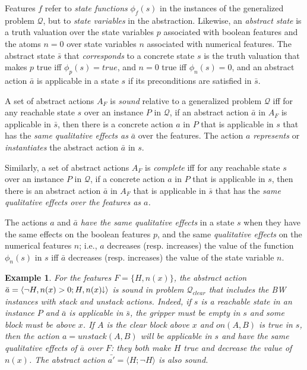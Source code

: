\documentclass[letterpaper]{article} %
\newcommand{\tup}[1]{\langle #1 \rangle}
\newtheorem{example}[definition]{Example}
\newcommand{\Q}{\mathcal{Q}}
\newcommand{\abst}[2]{\tup{#1;#2}}
\newcommand{\mminus}{\hspace{-.05em}\raisebox{.15ex}{\footnotesize$\downarrow$}}
\begin{document}
Features $f$ refer to \emph{state functions} $\phi_f(s)$  in the instances of the generalized problem $\Q$,
but to \emph{state variables} in the abstraction.  Likewise, an \emph{abstract state} is  a truth valuation over the
state variables  $p$ associated with boolean features and the atoms $n=0$ over  state variables  $n$ associated with numerical features.
The abstract state $\bar{s}$  that \emph{corresponds} to a concrete state $s$ is the truth valuation that makes
$p$ true iff $\phi_p(s)=true$, and $n=0$ true iff $\phi_n(s) = 0$, and an abstract action $\bar{a}$
is applicable in a state $s$ if its preconditions are satisfied in $\bar{s}$.

A set of abstract actions $A_F$ is \emph{sound}  relative to a generalized problem $\Q$ 
iff for any reachable state $s$ over an instance $P$ in $\Q$, if an abstract action $\bar{a}$ in $A_F$
is applicable in $\bar{s}$, then there is a concrete action $a$ in $P$ that is applicable in $s$
that has the \emph{same qualitative  effects as}  $\bar{a}$ over the features. The action $a$
\emph{represents} or \emph{instantiates}  the abstract action $\bar{a}$ in $s$. 

Similarly, a set of abstract actions $A_F$ is \emph{complete}
iff for any reachable state $s$ over an instance $P$ in $\Q$, if a concrete action $a$ in $P$
that is applicable in $s$, then there is an abstract action $\bar{a}$ in $A_F$
that is  applicable in $\bar{s}$ that has the \emph{same qualitative effects over the features as $a$.}


The actions $a$ and $\bar{a}$ \emph{have the same qualitative  effects} in a state $s$ 
when  they have the same   effects on the boolean features $p$,  and the same \emph{qualitative effects} on the numerical
features $n$; i.e., $a$ decreases (resp. increases) the value of the function $\phi_n(s)$ in $s$ iff
$\bar{a}$ decreases (resp. increases) the value of the state variable  $n$.

\begin{example}
  For the features $F=\{H,n(x)\}$, the abstract action  $\bar{a}=\abst{\neg H,n(x)>0}{H,n(x)\mminus}$ 
  is sound in  problem $\Q_{clear}$ that includes the BW instances with stack and unstack actions.
  Indeed, if $s$ is a reachable state in an instance $P$ and $\bar{a}$ is applicable in $\bar{s}$, 
  the gripper must be empty in $s$ and some block  must be above $x$. If $A$ is the clear block above $x$ and $on(A,B)$ is true in $s$,
  then the  action $a=unstack(A,B)$  will be  applicable in $s$ and have the same qualitative effects of  $\bar{a}$
  over $F$: they both make $H$ true and decrease the value of $n(x)$. The abstract action $\bar{a'}=\abst{H}{\neg H}$ is also sound.
\end{example}
\end{document}
